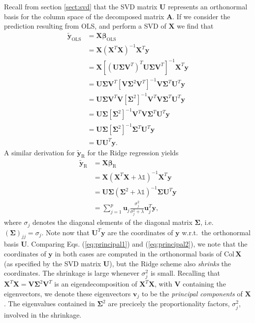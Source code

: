 \documentclass[a4paper]{article}
\begin{document}
\begin{multicols}{2}
Recall from section \ref{sect:svd} that the SVD matrix $\mathbf{U}$ represents an orthonormal basis for the column space of the decomposed matrix $\mathbf{A}$. If we consider the prediction resulting from OLS, and perform a SVD of $\mathbf{X}$ we find that
\begin{align}
\tilde{\mathbf{y}}_\text{OLS} &= \mathbf{X}\bm\beta_\text{OLS} \nonumber \\
%
&= \mathbf{X}\left(\mathbf{X}^T\mathbf{X}\right)^{-1}\mathbf{X}^T\mathbf{y} \nonumber \\
%
&= \mathbf{X} \left[ \left(\mathbf{U}\bm\Sigma \mathbf{V}^T\right)^T \mathbf{U}\bm\Sigma \mathbf{V}^T \right]^{-1} \mathbf{X}^T \mathbf{y} \nonumber \\
%
&= \mathbf{U}\bm\Sigma \mathbf{V}^T \left[\mathbf{V}\bm\Sigma^2 \mathbf{V}^T \right]^{-1} \mathbf{V}\bm\Sigma^T \mathbf{U}^T\mathbf{y} \nonumber \\
%
&= \mathbf{U}\bm\Sigma \mathbf{V}^T \mathbf{V} \left[\bm\Sigma^2  \right]^{-1}  \mathbf{V}^T \mathbf{V}\bm\Sigma^T \mathbf{U}^T\mathbf{y} \nonumber \\
%
&= \mathbf{U}\bm\Sigma \left[\bm\Sigma^2  \right]^{-1}  \mathbf{V}^T \mathbf{V}\bm\Sigma^T \mathbf{U}^T\mathbf{y} \nonumber \\
%
&= \mathbf{U}\bm\Sigma \left[\bm\Sigma^2  \right]^{-1} \bm\Sigma^T \mathbf{U}^T\mathbf{y} \nonumber \\
%
&= \mathbf{U}\mathbf{U}^T\mathbf{y}. \label{eq:principal1}
\end{align}
A similar derivation for $\tilde{\mathbf{y}}_\text{R}$ for the Ridge regression yields
\begin{align}
\tilde{\mathbf{y}}_\text{R} &= \mathbf{X}\bm\beta_\text{R} \nonumber \\
%
&= \mathbf{X}\left(\mathbf{X}^T\mathbf{X}+\lambda \mathds{1}\right)^{-1}\mathbf{X}^T\mathbf{y} \nonumber \\
%
&= \mathbf{U}\bm\Sigma\left(\bm\Sigma^2 + \lambda \mathds{1}\right)^{-1}\bm\Sigma \mathbf{U}^T\mathbf{y} \nonumber \\
%
&= \sum_{j=1}^p \mathbf{u}_j \frac{\sigma_j^2}{\sigma_j^2+\lambda}\mathbf{u}_j^T\mathbf{y}, \label{eq:principal2}
\end{align}
where $\sigma_j$ denotes the diagonal elements of the diagonal matrix $\bm\Sigma$, i.e.\ $(\bm\Sigma)_{jj}=\sigma_j$. Note now that $\mathbf{U}^T\mathbf{y}$ are the coordinates of $\mathbf{y}$ w.r.t.\ the orthonormal basis $\mathbf{U}$. Comparing Eqs. (\ref{eq:principal1}) and (\ref{eq:principal2}), we note that the coordinates of $\mathbf{y}$ in both cases are computed in the orthonormal basis of $\text{Col}\,\mathbf{X}$ (as specified by the SVD matrix $\mathbf{U}$), but the Ridge scheme also \textit{shrinks} the coordinates. The shrinkage is large whenever $\sigma_j^2$ is small. Recalling that $\mathbf{X}^T\mathbf{X}=\mathbf{V}\bm\Sigma^2\mathbf{V}^T$ is an eigendecomposition of $\mathbf{X}^T\mathbf{X}$, with $\mathbf{V}$ containing the eigenvectors, we denote these eigenvectors $\mathbf{v}_j$ to be the \textit{principal components} of $\mathbf{X}$. The eigenvalues contained in $\bm\Sigma^2$ are precicely the proportionality factors, $\sigma^2_j$, involved in the shrinkage. 


\end{multicols}
\end{document}
